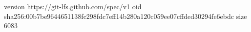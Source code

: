 version https://git-lfs.github.com/spec/v1
oid sha256:00b7be9644651138fc298fdc7eff14b280a120c059ee07cffded30294fe6ebdc
size 6083
